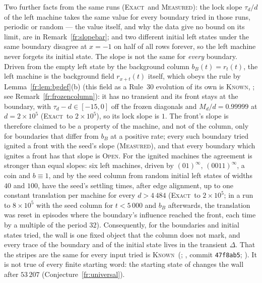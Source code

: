 \documentclass[11pt]{article}
\theoremstyle{definition}
\theoremstyle{remark}
\newcommand{\EXACT}{\textsc{Exact}}
\newcommand{\MEASURED}{\textsc{Measured}}
\newcommand{\KNOWN}{\textsc{Known}}
\newcommand{\OPEN}{\textsc{Open}}
\begin{document}
Two further facts from the same runs (\EXACT\ and \MEASURED): the lock slope $\tau_d/d$ of the left
machine takes the same value for every boundary tried in those runs, periodic or random --- the value itself, and why the data give no bound
on its limit, are in Remark~\ref{fr:slopebar}; and two different initial left states under the same boundary disagree at $x=-1$ on half of all rows forever, so the left machine never forgets its initial state.
The slope is not the same for \emph{every} boundary. Driven from the empty left state by the background
column $b_B(t)=r_t(t)$, the left machine is the background field $r_{x+t}(t)$ itself, which obeys the rule by
Lemma~\ref{fr:lem:bgdef}(b) (this field as a Rule~30 evolution of its own is \KNOWN, \cite{Dib}; see Remark~\ref{fr:frozencolumn}): it has no transient and its front stays at the boundary, with
$\tau_d-d\in[-15,0]$ off the frozen diagonals and $M_d/d=0.99999$ at $d=2\times10^{5}$ (\EXACT\ to
$2\times10^{5}$), so its lock slope is $1$. The front's slope is therefore claimed to be a property of the
machine, and not of the column, only for boundaries that differ from $b_B$ at a positive rate; every such
boundary tried ignited a front with the seed's slope (\MEASURED), and that every boundary which ignites a
front has that slope is \OPEN. For the ignited machines the agreement is stronger than equal slopes: six
left machines, driven by $(01)^\infty$, $(0011)^\infty$, a coin and $b\equiv1$, and by the seed column from
random initial left states of widths $40$ and $100$, have the seed's settling times, after edge alignment,
up to one constant translation per machine for every $d>4\,484$ (\EXACT\ to $2\times10^{5}$; in a run to
$8\times10^{5}$ with the seed column for $t<5\,000$ and $b_B$ afterwards, the translation was reset in
episodes where the boundary's influence reached the front, each time by a multiple of the period $32$). Consequently, for the boundaries and initial states tried, the wall is one fixed object that the column does not mark, and every trace of the boundary and of the initial state lives in the transient $\Delta$. That the stripes are the same for every input tried is \KNOWN\ (\cite[\S8]{GG}; \cite{Dib}, commit \texttt{47f8ab5}; \cite{Lania}). It is not true of every finite starting word: the starting state of \cite{Lania} changes the wall after $53\,207$ (Conjecture~\ref{fr:universal}).
\end{document}
